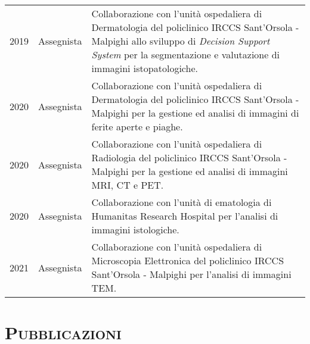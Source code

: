 \documentclass[a4paper,11pt]{article}
\begin{document}
\begin{tabular}{llp{12cm}}
  2019\textemdash2022 & Assegnista      & Collaborazione con l'unità ospedaliera di Dermatologia del policlinico IRCCS Sant'Orsola - Malpighi allo sviluppo di \emph{Decision Support System} per la segmentazione e valutazione di immagini istopatologiche.\\
  2020\textemdash2022 & Assegnista      & Collaborazione con l'unità ospedaliera di Dermatologia del policlinico IRCCS Sant'Orsola - Malpighi per la gestione ed analisi di immagini di ferite aperte e piaghe.\\
  2020\textemdash2022 & Assegnista      & Collaborazione con l'unità ospedaliera di Radiologia del policlinico IRCCS Sant'Orsola - Malpighi per la gestione ed analisi di immagini MRI, CT e PET.\\
  2020\textemdash2022 & Assegnista      & Collaborazione con l'unità di ematologia di Humanitas Research Hospital per l'analisi di immagini istologiche.\\
  2021\textemdash2022 & Assegnista      & Collaborazione con l'unità ospedaliera di Microscopia Elettronica del policlinico IRCCS Sant'Orsola - Malpighi per l'analisi di immagini TEM.\\

\end{tabular}


\vspace*{0.5cm}
\section*{\scshape{Pubblicazioni}}
\end{document}

